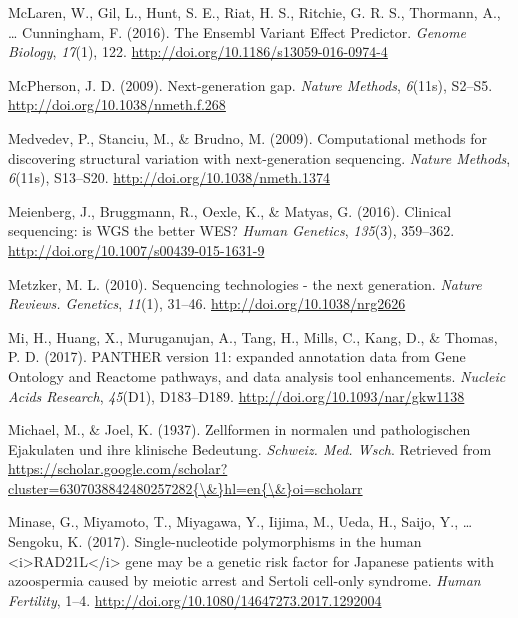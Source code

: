 \documentclass[12pt,twoside]{reedthesis}
\theoremstyle{definition}
\theoremstyle{definition}
\theoremstyle{remark}
\begin{document}
  \hypertarget{ref-McLaren2016}{}
  McLaren, W., Gil, L., Hunt, S. E., Riat, H. S., Ritchie, G. R. S.,
  Thormann, A., \ldots{} Cunningham, F. (2016). The Ensembl Variant Effect
  Predictor. \emph{Genome Biology}, \emph{17}(1), 122.
  \url{http://doi.org/10.1186/s13059-016-0974-4}
  
  \hypertarget{ref-McPherson2009}{}
  McPherson, J. D. (2009). Next-generation gap. \emph{Nature Methods},
  \emph{6}(11s), S2--S5. \url{http://doi.org/10.1038/nmeth.f.268}
  
  \hypertarget{ref-Medvedev2009}{}
  Medvedev, P., Stanciu, M., \& Brudno, M. (2009). Computational methods
  for discovering structural variation with next-generation sequencing.
  \emph{Nature Methods}, \emph{6}(11s), S13--S20.
  \url{http://doi.org/10.1038/nmeth.1374}
  
  \hypertarget{ref-Meienberg2016}{}
  Meienberg, J., Bruggmann, R., Oexle, K., \& Matyas, G. (2016). Clinical
  sequencing: is WGS the better WES? \emph{Human Genetics}, \emph{135}(3),
  359--362. \url{http://doi.org/10.1007/s00439-015-1631-9}
  
  \hypertarget{ref-Metzker2010}{}
  Metzker, M. L. (2010). Sequencing technologies - the next generation.
  \emph{Nature Reviews. Genetics}, \emph{11}(1), 31--46.
  \url{http://doi.org/10.1038/nrg2626}
  
  \hypertarget{ref-Mi2017}{}
  Mi, H., Huang, X., Muruganujan, A., Tang, H., Mills, C., Kang, D., \&
  Thomas, P. D. (2017). PANTHER version 11: expanded annotation data from
  Gene Ontology and Reactome pathways, and data analysis tool
  enhancements. \emph{Nucleic Acids Research}, \emph{45}(D1), D183--D189.
  \url{http://doi.org/10.1093/nar/gkw1138}
  
  \hypertarget{ref-Michael1937}{}
  Michael, M., \& Joel, K. (1937). Zellformen in normalen und
  pathologischen Ejakulaten und ihre klinische Bedeutung. \emph{Schweiz.
  Med. Wsch}. Retrieved from
  \href{https://scholar.google.com/scholar?cluster=6307038842480257282\%7B/\&\%7Dhl=en\%7B/\&\%7Doi=scholarr}{https://scholar.google.com/scholar?cluster=6307038842480257282\{\textbackslash{}\&\}hl=en\{\textbackslash{}\&\}oi=scholarr}
  
  \hypertarget{ref-Minase2017}{}
  Minase, G., Miyamoto, T., Miyagawa, Y., Iijima, M., Ueda, H., Saijo, Y.,
  \ldots{} Sengoku, K. (2017). Single-nucleotide polymorphisms in the
  human \textless{}i\textgreater{}RAD21L\textless{}/i\textgreater{} gene
  may be a genetic risk factor for Japanese patients with azoospermia
  caused by meiotic arrest and Sertoli cell-only syndrome. \emph{Human
  Fertility}, 1--4. \url{http://doi.org/10.1080/14647273.2017.1292004}
  
\end{document}
